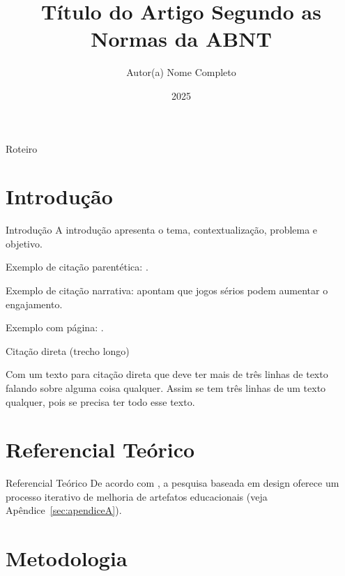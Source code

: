 \documentclass[aspectratio=169]{beamer}
\title{Título do Artigo Segundo as Normas da ABNT}
\author{Autor(a) Nome Completo}
\institute{Instituição\\ \href{mailto:autor@exemplo.com}{autor@exemplo.com}}
\date{2025}
\begin{document}
\begin{frame}
  \titlepage
\end{frame}

\begin{frame}{Roteiro}
  \tableofcontents
\end{frame}

\section{Introdução}

\begin{frame}{Introdução}
A introdução apresenta o tema, contextualização, problema e objetivo.

Exemplo de citação parentética: \parencite{albuquerqueToyUserInterfaces2021}.

Exemplo de citação narrativa: \textcite{aragaoEnsinoProgramacaoPensamento2023}
apontam que jogos sérios podem aumentar o engajamento.

Exemplo com página: \parencite[p.~25]{azumaRecentAdvancesAugmentedReality2001}.
\end{frame}

\begin{frame}{Citação direta (trecho longo)}
\small
\begin{displayquote}
Com um texto para citação direta que deve ter mais de três linhas de texto
falando sobre alguma coisa qualquer. Assim se tem três linhas de um texto
qualquer, pois se precisa ter todo esse texto.
\end{displayquote}
\end{frame}

\section{Referencial Teórico}

\begin{frame}{Referencial Teórico}
De acordo com \parencite{pimentelDesignScienceResearch2020}, a pesquisa baseada em
design oferece um processo iterativo de melhoria de artefatos educacionais
(veja Apêndice~\ref{sec:apendiceA}).
\end{frame}

\section{Metodologia}
\end{document}
